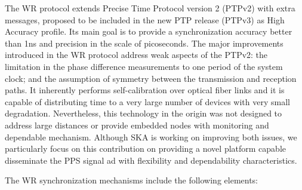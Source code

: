 The WR protocol extends Precise Time Protocol version 2 (PTPv2) with extra messages, proposed to be included in the new PTP release (PTPv3) as High Accuracy profile. Its main goal is to provide a synchronization accuracy better than 1ns and precision in the scale of picoseconds. The major improvements introduced in the WR protocol address weak aspects of the PTPv2: the limitation in the phase difference measurements to one period of the system clock; and the assumption of symmetry between the transmission and reception paths. It inherently performs self-calibration over optical fiber links and it is capable of distributing time to a very large number of devices with very small degradation. Nevertheless, this technology in the origin was not designed to address large distances or provide embedded nodes with monitoring and dependable mechanism. Although SKA is working on improving both issues, we particularly focus on this contribution on providing a novel platform capable disseminate the PPS signal ad with flexibility and dependability characteristics.  



The WR synchronization mechanisms include the following elements:

